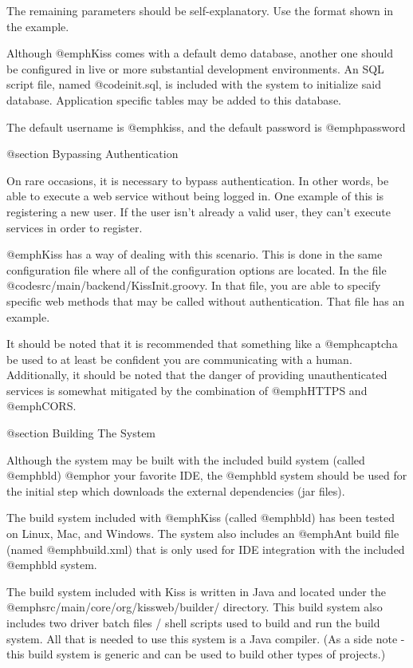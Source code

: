 The remaining parameters should be self-explanatory.  Use the format
shown in the example.

Although @emph{Kiss} comes with a default demo database, another one
should be configured in live or more substantial development
environments.  An SQL script file, named @code{init.sql}, is included
with the system to initialize said database.  Application specific tables
may be added to this database.

The default username is @emph{kiss}, and the default password is
@emph{password}

@section Bypassing Authentication

On rare occasions, it is necessary to bypass authentication.  In other
words, be able to execute a web service without being logged in.  One
example of this is registering a new user.  If the user isn't already a
valid user, they can't execute services in order to register.

@emph{Kiss} has a way of dealing with this scenario.  This is done in
the same configuration file where all of the configuration options are
located.  In the file @code{src/main/backend/KissInit.groovy}.  In
that file, you are able to specify specific web methods that may be
called without authentication.  That file has an example.

It should be noted that it is recommended that something like a
@emph{captcha} be used to at least be confident you are
communicating with a human.  Additionally, it should be noted that the
danger of providing unauthenticated services is somewhat mitigated by
the combination of @emph{HTTPS} and @emph{CORS}.

@section Building The System

Although the system may be built with the included build system
(called @emph{bld}) @emph{or} your favorite IDE, the @emph{bld}
system should be used for the initial step which downloads the external
dependencies (jar files).

The build system included with @emph{Kiss} (called @emph{bld}) has
been tested on Linux, Mac, and Windows.  The system also includes an
@emph{Ant} build file (named @emph{build.xml}) that is only used for
IDE integration with the included @emph{bld} system.

The build system included with Kiss is written in Java and located
under the @emph{src/main/core/org/kissweb/builder/} directory.  This
build system also includes two driver batch files / shell scripts used
to build and run the build system.  All that is needed to use this
system is a Java compiler.  (As a side note - this build system is
generic and can be used to build other types of projects.)

